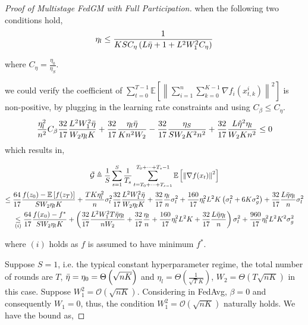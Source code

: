 \begin{proof}[Proof of Multistage FedGM with Full Participation]
when the following two conditions hold,
\begin{equation}
\begin{gathered}
\eta_l\leq \frac{1}{K S C_\eta \left(L \Bar{\eta}  + 1 + L^2 W_1^2 C_\eta \right)}
\end{gathered}\nonumber
\end{equation}

where $C_\eta=\frac{\eta_0}{\eta_S}$. 


we could verify the coefficient of $\sum_{t=0}^{T-1}\mathbb{E}\left[\left\| \sum_{i=1}^n\sum_{k=0}^{K-1}  \nabla f_i(x_{t,k}^i) \right\|^2\right]$ is non-positive, by plugging in the learning rate constraints and using $C_\beta\leq C_\eta$.
\begin{equation}
\begin{gathered}
\frac{\eta^2_l}{n^2} C_\beta \frac{32}{17} \frac{L^2 W_1^2 \Bar{\eta}}{W_2\eta_l K} +  \frac{32}{17} \frac{\eta_l\Bar{\eta}}{Kn^2 W_2} - \frac{32}{17}\frac{\eta_S}{S W_2K^2n^2} + \frac{32}{17} \frac{L \hat{\eta}^2  \eta_l }{W_2 K n^2} \leq 0
\end{gathered}\nonumber
\end{equation}
which results in,

\begin{equation}
\begin{gathered}
\Bar{\mathcal{G}} \triangleq \frac{1}{S} \sum_{s=1}^{S} \frac{1}{T_s} \sum_{t=T_0+\dots+T_{s-1}}^{T_0+\dots+T_s-1} \mathbb{E}\left[\left\|\nabla f(x_t)\right\|^2\right]\\
\leq \frac{64}{17}\frac{f(z_0)-\mathbb{E}\left[f(z_{T})\right]}{S W_2 \eta_l K} + \frac{T K\eta_l^2}{n} \sigma^2_l \frac{32}{17} \frac{L^2 W_1^2 \Bar{\eta}}{W_2\eta_l K} 
+\frac{32}{17}\frac{\eta_l}{n}\sigma_l^2  +\frac{160}{17} \eta_l^2L^2K \left(\sigma_l^2+6K\sigma_g^2\right)+\frac{32}{17} \frac{L \Bar{\eta} \eta_l }{n}\sigma_l^2\\
\underset{(i)}{\leq} \frac{64}{17}\frac{f(x_0)-f^\ast}{S W_2 \eta_l K} + \left( \frac{32}{17}\frac{L^2 W_1^2 T \Bar{\eta} \eta_l}{n W_2} +\frac{32}{17}\frac{\eta_l}{n}+\frac{160}{17} \eta_l^2L^2K+\frac{32}{17} \frac{L \Bar{\eta} \eta_l }{n}\right)  \sigma_l^2+
\frac{960}{17} \eta_l^2L^2K^2 \sigma_g^2
\end{gathered}\nonumber
\end{equation}

where $(i)$ holds as $f$ is assumed to have minimum $f^\ast$.



Suppose $S=1$, i.e. the typical constant hyperparameter regime, the total number of rounds are $T$, $\Bar{\eta}=\eta_0=\Theta\left(\sqrt{nK}\right)$ and $\eta_l=\Theta\left(\frac{1}{\sqrt{T}K}\right)$, $W_2=\Theta\left(T\sqrt{nK}\right)$ in this case. Suppose $W_1^2=\mathcal{O}\left(\sqrt{nK}\right)$. Considering in FedAvg, $\beta=0$ and consequently $W_1=0$, thus, the condition $W_1^2=\mathcal{O}\left(\sqrt{nK}\right)$ naturally holds. We have the bound as,


\end{proof}
